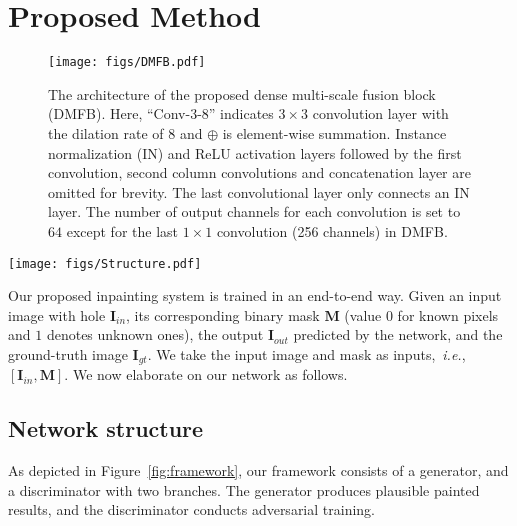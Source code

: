 \documentclass[journal]{IEEEtran}
\newcommand{\ie}{\emph{i.e.}}
\begin{document}
\section{Proposed Method}\label{sec:proposed-method}
\begin{figure}[htpb]
	\begin{center}
		\texttt{[image: figs/DMFB.pdf]}
	\end{center}
	\caption{The architecture of the proposed dense multi-scale fusion block (DMFB). Here, ``Conv-3-8'' indicates $3 \times 3$ convolution layer with the dilation rate of $8$ and $ \oplus $ is element-wise summation. Instance normalization (IN) and ReLU activation layers followed by the first convolution, second column convolutions and concatenation layer are omitted for brevity. The last convolutional layer only connects an IN layer. The number of output channels for each convolution is set to $64$ except for the last $1 \times 1$ convolution (256 channels) in DMFB.} 
	\label{fig:DMFB}
\end{figure}

\begin{figure*}[htpb]
	\begin{center}
		\texttt{[image: figs/Structure.pdf]}
	\end{center}
	\caption{The framework of our method. The activation layer followed by each ``convolution + norm'' or convolution layer in the generator is omitted for conciseness. The activation function adopts ReLU except for the last convolution (Tanh) in the generator. \textcolor{blue}{Blue} dotted box indicates our upsampler module (TConv-4 is $4 \times 4$ transposed convolution) and  ``$s2$'' denotes the stride of 2.}
	\label{fig:framework}
\end{figure*}

Our proposed inpainting system is trained in an end-to-end way. Given an input image with hole ${ \mathbf{I}_{in}}$, its corresponding binary mask $\mathbf{M}$ (value $0$ for known pixels and 
$1$ denotes unknown ones), the output ${\mathbf{I}_{out}}$ predicted by the network, and the ground-truth image ${\mathbf{I}_{gt}}$. We take the input image and mask as inputs,~\ie, $[{\mathbf{I}_{in}},\mathbf{M}]$. We now elaborate on our network as follows.

\subsection{Network structure}
As depicted in Figure~\ref{fig:framework}, our framework consists of a generator, and a discriminator with two branches. The generator produces plausible painted results, and the discriminator conducts adversarial training. 
\end{document}
